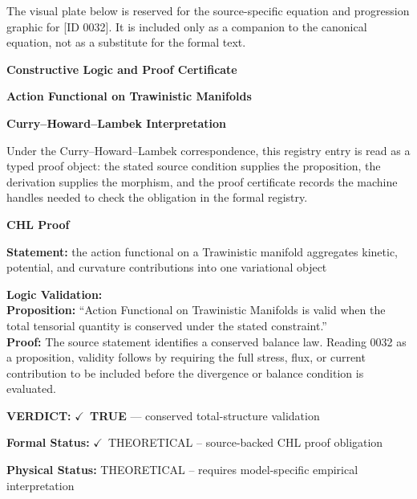 \begingroup\footnotesize\sloppy
The visual plate below is reserved for the source-specific equation and progression graphic for [ID 0032]. It is included only as a companion to the canonical equation, not as a substitute for the formal text.
\par\endgroup
\ifTZPDarkEdition
{}
\fi

\clearpage
\begingroup\tzpsupportsetup
\noindent\textbf{\fontsize{10.8pt}{12.8pt}\selectfont [ID 0032] Constructive Logic and Proof Certificate}\par
\noindent\textbf{\fontsize{10pt}{12pt}\selectfont Action Functional on Trawinistic Manifolds}\par
\vspace{0.45em}
\begingroup
\footnotesize
\setlength{\parskip}{0.22em}
\setlength{\parindent}{0pt}
\noindent\textbf{Curry--Howard--Lambek Interpretation}\par
Under the Curry--Howard--Lambek correspondence, this registry entry is read as a typed proof
object: the stated source condition supplies the proposition, the derivation supplies the
morphism, and the proof certificate records the machine handles needed to check the obligation
in the formal registry.

\vspace{0.45em}
\noindent\textbf{CHL Proof}\par
\textbf{Statement:} the action functional on a Trawinistic manifold aggregates kinetic, potential, and
curvature contributions into one variational object

\textbf{Logic Validation:}\\
\textbf{Proposition:} ``Action Functional on Trawinistic Manifolds is valid when the total tensorial quantity is
conserved under the stated constraint.''\\
\textbf{Proof:} The source statement identifies a conserved balance law. Reading 0032 as a proposition,
validity follows by requiring the full stress, flux, or current contribution to be
included before the divergence or balance condition is evaluated.

\textbf{VERDICT:} \ensuremath{\checkmark}\ \textbf{TRUE} --- conserved total-structure validation

\textbf{Formal Status:} \ensuremath{\checkmark}\ THEORETICAL -- source-backed CHL proof obligation

\textbf{Physical Status:} THEORETICAL -- requires model-specific empirical interpretation
\par\vspace{0.45em}
\par
\ifTZPDarkEdition
{}
\fi
\endgroup
\endgroup
